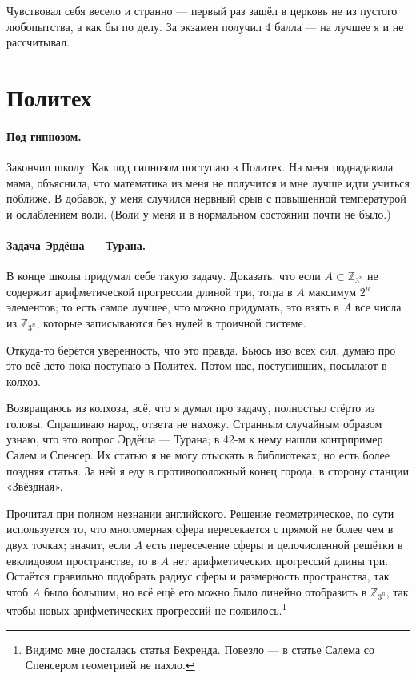 \documentclass{book}
\begin{document}
Чувствовал себя весело и странно --- первый раз зашёл в церковь не из пустого любопытства, а как бы по делу.
За экзамен получил 4 балла --- на лучшее я и не рассчитывал.

\section*{Политех}

\paragraph{Под гипнозом.}
Закончил школу.
Как под гипнозом поступаю в Политех.
На меня поднадавила мама, объяснила, что математика из меня не получится и мне лучше идти учиться поближе.
В добавок, у меня случился нервный срыв с повышенной температурой и ослаблением воли.
(Воли у меня и в нормальном состоянии почти не было.) 

\paragraph{Задача Эрдёша --- Турана.}
В конце школы придумал себе такую задачу.
Доказать, что если $A\subset\mathbb{Z}_{3^n}$ не содержит арифметической прогрессии длиной три, тогда в $A$ максимум $2^n$ элементов;
то есть самое лучшее, 
что можно придумать, это  взять в $A$ все числа из $\mathbb{Z}_{3^n}$, 
которые записываются без нулей в троичной системе.

Откуда-то берётся уверенность, что это правда.
Бьюсь изо всех сил, думаю про это всё лето пока поступаю в Политех.
Потом нас, поступивших, посылают в колхоз.

Возвращаюсь из колхоза, всё, что я думал про задачу, полностью стёрто из головы.
Спрашиваю народ, ответа не нахожу.
Странным случайным образом узнаю,
что это вопрос Эрдёша --- Турана;
в 42-м к нему нашли контрпример Салем и Спенсер.
Их статью я не могу отыскать в библиотеках, но есть более поздняя статья. 
За ней я еду в противоположный конец города, в сторону станции «Звёздная».

Прочитал при полном незнании английского.
Решение геометрическое, по сути используется то, 
что многомерная сфера пересекается с прямой не более чем в двух точках;
значит, если $A$ есть пересечение сферы и целочисленной решётки в евклидовом пространстве,
то в $A$ нет арифметических прогрессий длины три.
Остаётся правильно подобрать радиус сферы и размерность пространства,
так чтоб $A$ было большим,
но всё ещё его можно было 
линейно отобразить в $\mathbb{Z}_{3^n}$, так чтобы новых арифметических прогрессий не появилось.\footnote{Видимо мне досталась статья Бехренда.
Повезло --- в статье Салема со Спенсером геометрией не пахло.}
\end{document}
